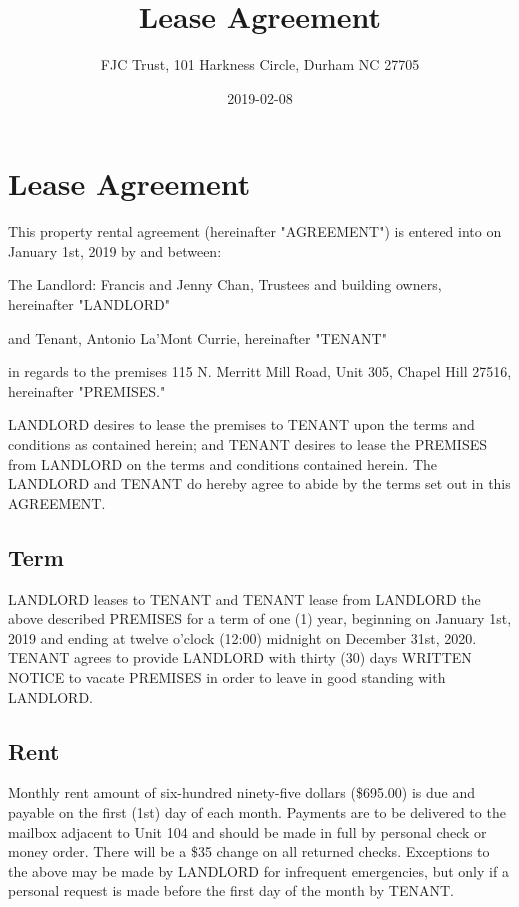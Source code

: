 \documentclass[11pt]{article}
\author{FJC Trust, 101 Harkness Circle, Durham NC 27705}
\date{2019-02-08}
\title{Lease Agreement}
\begin{document}
\maketitle
\tableofcontents

\section{Lease Agreement}
\label{sec:org88e0106}
This property rental agreement (hereinafter "AGREEMENT") is entered
into on January 1st, 2019 by and between:

The Landlord: Francis and Jenny Chan, Trustees and building owners,
hereinafter "LANDLORD"

and Tenant, Antonio La'Mont Currie, hereinafter "TENANT"

in regards to the premises 115 N. Merritt Mill Road, Unit 305,
Chapel Hill 27516, hereinafter "PREMISES."

LANDLORD desires to lease the premises to TENANT upon the terms and
conditions as contained herein; and TENANT desires to lease the
PREMISES from LANDLORD on the terms and conditions contained herein.
The LANDLORD and TENANT do hereby agree to abide by the terms set out
in this AGREEMENT.

\subsection{Term}
\label{sec:org22e264b}
LANDLORD leases to TENANT and TENANT lease from LANDLORD the above
described PREMISES for a term of one (1) year, beginning on
January 1st, 2019 and ending at twelve o'clock (12:00) midnight on
December 31st, 2020.  TENANT agrees to provide LANDLORD with thirty (30)
days WRITTEN NOTICE to vacate PREMISES in order to leave in good
standing with LANDLORD.

\subsection{Rent}
\label{sec:orgbb14550}
Monthly rent amount of six-hundred ninety-five dollars (\$695.00) is due
and payable on the first (1st) day of each month.  Payments are to be
delivered to the mailbox adjacent to Unit 104 and should be made in
full by personal check or money order.  There will be a \$35 change on
all returned checks.  Exceptions to the above may be made by LANDLORD
for infrequent emergencies, but only if a personal request is made
before the first day of the month by TENANT.
\end{document}
